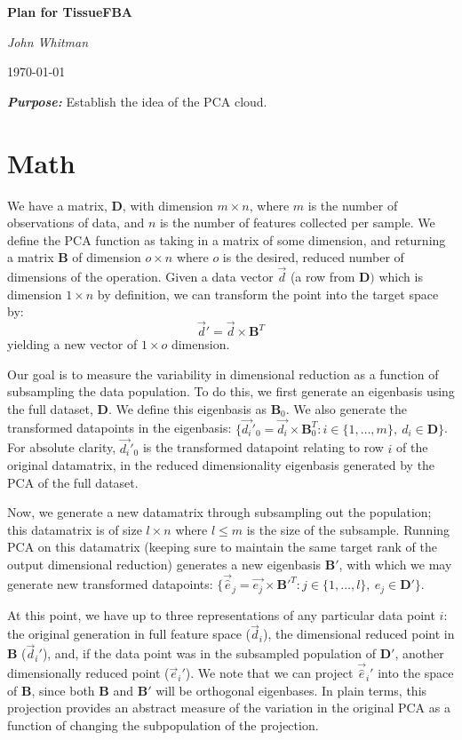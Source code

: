 \documentclass{article}
\newcommand{\custitle}[2]{\begin{center}\Large \textbf{#1}\vspace{.5cm}\par\large\textit{#2}\par\small \today\end{center}}
\newcommand{\leader}[1]{\textbf{\textit{#1:}}}
\begin{document}
\onehalfspacing
\custitle{Plan for TissueFBA}{John Whitman}
\leader{Purpose} Establish the idea of the PCA cloud. 
\section*{Math}
We have a matrix, $\mathbf{D}$, with dimension $m\times n$, where $m$ is the number of observations of data, and $n$ is the number of features collected per sample. We define the PCA function as taking in a matrix of some dimension, and returning a matrix $\mathbf{B}$ of dimension $o \times n$ where $o$ is the desired, reduced number of dimensions of the operation. Given a data vector $\vec{d}$ (a row from $\mathbf{D})$ which is dimension $1 \times n$ by definition, we can transform the point into the target space by:
\begin{equation}
    \vec{d}' = \vec{d} \times \mathbf{B}^T
\end{equation}
yielding a new vector of $1 \times o$ dimension.\par
Our goal is to measure the variability in dimensional reduction as a function of subsampling the data population. To do this, we first generate an eigenbasis using the full dataset, $\mathbf{D}$. We define this eigenbasis as $\mathbf{B}_0$. We also generate the transformed datapoints in the eigenbasis: $\{\vec{d_i}'_0 = {\vec{d_i}\times \mathbf{B}_0^T :  i \in \{1,\dots, m\},\ d_i \in \mathbf{D}}\}$. For absolute clarity, $\vec{d_i}'_0$ is the transformed datapoint relating to row $i$ of the original datamatrix, in the reduced dimensionality eigenbasis generated by the PCA of the full dataset.\par
Now, we generate a new datamatrix through subsampling out the population; this datamatrix is of size $l \times n$ where $l\leq m$ is the size of the subsample. Running PCA on this datamatrix (keeping sure to maintain the same target rank of the output dimensional reduction) generates a new eigenbasis $\mathbf{B}'$, with which we may generate new transformed datapoints: $\{\vec{\hat{e}}_j = \vec{e_j} \times \mathbf{B}'^T : j \in \{1,\dots, l\}, \ e_j \in \mathbf{D}'\}$.\par
At this point, we have up to three representations of any particular data point $i$: the original generation in full feature space ($\vec{d}_i$), the dimensional reduced point in $\mathbf{B}$ ($\vec{d}_i'$), and, if the data point was in the subsampled population of $\mathbf{D}'$, another dimensionally reduced point ($\vec{e}_i'$). We note that we can project $\vec{\hat{e}}_i'$ into the space of $\mathbf{B}$, since both $\mathbf{B}$ and $\mathbf{B}'$ will be orthogonal eigenbases. In plain terms, this projection provides an abstract measure of the variation in the original PCA as a function of changing the subpopulation of the projection.\par
\end{document}
